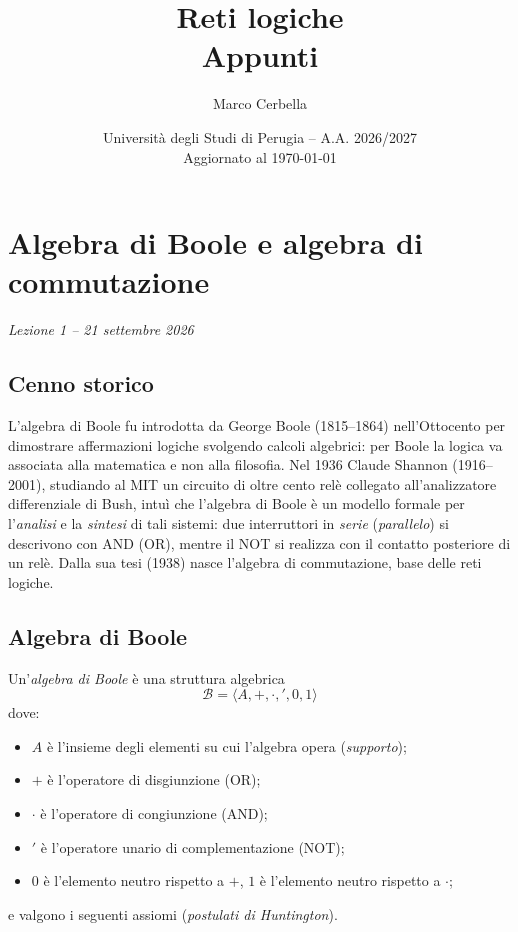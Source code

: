 \documentclass[11pt,a4paper]{article}
\title{Reti logiche\\[0.4em]\large Appunti}
\author{Marco Cerbella}
\date{Università degli Studi di Perugia -- A.A. 2026/2027\\ Aggiornato al \today}
\begin{document}
\maketitle
\setcounter{tocdepth}{1}
\tableofcontents
\clearpage

\section[Algebra di Boole e algebra di commutazione (Lezione 1 -- 21 settembre 2026)]{Algebra di Boole e algebra di commutazione}
\noindent\emph{Lezione 1 -- 21 settembre 2026}
\subsection*{Cenno storico}

L'algebra di Boole fu introdotta da George Boole (1815--1864) nell'Ottocento per
dimostrare affermazioni logiche svolgendo calcoli algebrici: per Boole la
logica va associata alla matematica e non alla filosofia. Nel 1936 Claude
Shannon (1916--2001), studiando al MIT un circuito di oltre cento relè
collegato all'analizzatore differenziale di Bush, intuì che l'algebra di Boole
è un modello formale per l'\emph{analisi} e la \emph{sintesi} di tali sistemi:
due interruttori in \emph{serie} (\emph{parallelo}) si descrivono con AND (OR),
mentre il NOT si realizza con il contatto posteriore di un relè. Dalla sua tesi
(1938) nasce l'algebra di commutazione, base delle reti logiche.

\subsection{Algebra di Boole}

\begin{definizione}
Un'\emph{algebra di Boole} è una struttura algebrica
\[
  \mathcal{B} = \langle A, +, \cdot, ', 0, 1 \rangle
\]
dove:
\begin{itemize}
    \item $A$ è l'insieme degli elementi su cui l'algebra opera (\emph{supporto});
    \item $+$ è l'operatore di disgiunzione (OR);
    \item $\cdot$ è l'operatore di congiunzione (AND);
    \item $'$ è l'operatore unario di complementazione (NOT);
    \item $0$ è l'elemento neutro rispetto a $+$, $1$ è l'elemento neutro
          rispetto a $\cdot$;
\end{itemize}
e valgono i seguenti assiomi (\emph{postulati di Huntington}).
\end{definizione}
\end{document}
